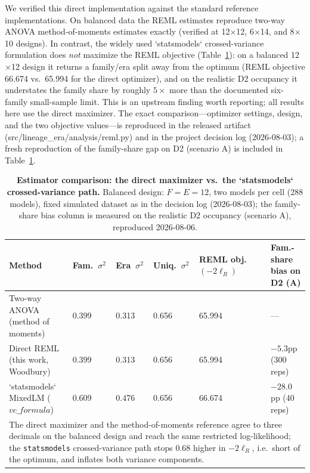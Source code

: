 \documentclass{ieeeaccess}
\theoremstyle{definition}
\theoremstyle{plain}
\begin{document}
We verified this direct implementation against the standard reference
implementations. On balanced data the REML estimates reproduce two-way ANOVA
method-of-moments estimates exactly (verified at 12$\times$12, 6$\times$14, and
8$\times$10 designs). In contrast, the widely used `statsmodels` crossed-variance
formulation does \emph{not} maximize the REML objective (Table~\ref{tab:estcomp}):
on a balanced 12$\times$12 design it returns a family/era split away from the
optimum (REML objective 66.674 vs.\ 65.994 for the direct optimizer), and on the
realistic D2 occupancy it understates the family share by roughly $5\times$ more
than the documented six-family small-sample limit. This is an upstream finding
worth reporting; all results here use the direct maximizer. The exact
comparison---optimizer settings, design, and the two objective values---is
reproduced in the released artifact
(src/lineage\_era/analysis/reml.py) and in the project decision log (2026-08-03);
a fresh reproduction of the family-share gap on D2 (scenario A) is included in
Table~\ref{tab:estcomp}.

\begin{table}[!t]
\caption{\textbf{Estimator comparison: the direct maximizer vs.\ the
`statsmodels` crossed-variance path.} Balanced design: $F{=}E{=}12$, two models
per cell (288 models), fixed simulated dataset as in the decision log
(2026-08-03); the family-share bias column is measured on the realistic D2
occupancy (scenario A), reproduced 2026-08-06.}
\label{tab:estcomp}
\setlength{\tabcolsep}{5pt}
\begin{tabular}{|p{132pt}|p{46pt}|p{46pt}|p{46pt}|p{62pt}|p{92pt}|}
\hline
Method & Fam.\ $\sigma^{2}$ & Era\ $\sigma^{2}$ & Uniq.\ $\sigma^{2}$ & REML obj.\ $(-2\ell_{R})$ & Fam.-share bias on D2 (A) \\
\hline
Two-way ANOVA (method of moments) & 0.399 & 0.313 & 0.656 & 65.994 & --- \\
Direct REML (this work, Woodbury) & 0.399 & 0.313 & 0.656 & 65.994 & $-5.3$pp (300 reps)\\
`statsmodels` MixedLM ($vc\_formula$) & 0.609 & 0.476 & 0.656 & 66.674 & $-28.0$pp (40 reps)\\
\hline
\multicolumn{6}{p{470pt}}{The direct maximizer and the method-of-moments
reference agree to three decimals on the balanced design and reach the same
restricted log-likelihood; the \texttt{statsmodels} crossed-variance path stops
$0.68$ higher in $-2\ell_{R}$, i.e.\ short of the optimum, and inflates both
variance components.}\\
\end{tabular}
\end{table}
\end{document}
